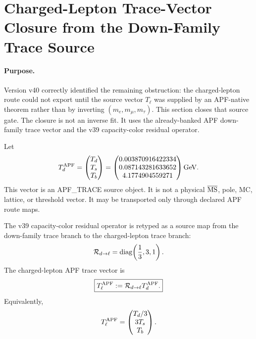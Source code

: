 
\section{Charged-Lepton Trace-Vector Closure from the Down-Family Trace Source}\label{sec:charged-lepton-trace-vector-closure-v41}

\paragraph{Purpose.}
Version v40 correctly identified the remaining obstruction: the charged-lepton route could not export until the source vector
\(T_\ell\) was supplied by an APF-native theorem rather than by inverting \((m_e,m_\mu,m_\tau)\).  This section closes that source gate.  The closure is not an inverse fit.  It uses the already-banked APF down-family trace vector and the v39 capacity-color residual operator.

\begin{definition}\label{def:down-family-trace-source-v41}
Let
\[
  T_d^{\rm APF}
  =
  \begin{pmatrix}
  T_d\\ T_s\\ T_b
  \end{pmatrix}
  =
  \begin{pmatrix}
  0.003870916422334\\
  0.087143281633652\\
  4.1774904559271
  \end{pmatrix}{\rm GeV}.
\]
This vector is an APF\_TRACE source object.  It is not a physical \(\overline{\rm MS}\), pole, MC, lattice, or threshold vector.  It may be transported only through declared APF route maps.
\end{definition}

\begin{definition}\label{def:charged-lepton-source-map-v41}
The v39 capacity-color residual operator is retyped as a source map from the down-family trace branch to the charged-lepton trace branch:
\[
   \mathcal R_{d\to\ell}
   =\operatorname{diag}\!\left({1\over3},3,1\right).
\]
The charged-lepton APF trace vector is
\[
   \boxed{T_\ell^{\rm APF}:=\mathcal R_{d\to\ell}T_d^{\rm APF}.}
\]
Equivalently,
\[
  T_\ell^{\rm APF}
  =
  \begin{pmatrix}
  T_d/3\\ 3T_s\\ T_b
  \end{pmatrix}.
\]
\end{definition}

